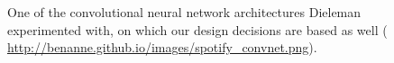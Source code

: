 \documentclass[11pt, a4paper]{article}
\begin{document}
    \begin{figure}
      \centering
      \caption{One of the convolutional neural network architectures Dieleman
        experimented with, on which our design decisions are based as well
        (\url{ http://benanne.github.io/images/spotify\_convnet.png}).}
    \end{figure}
\end{document}

